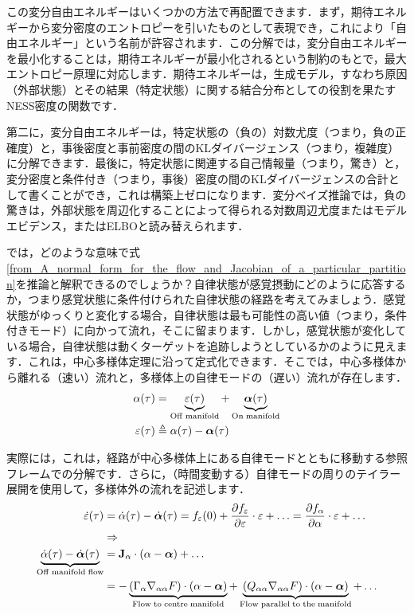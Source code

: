 \documentclass[a4paper, titlepage]{jsarticle}
\begin{document}
この変分自由エネルギーはいくつかの方法で再配置できます．まず，期待エネルギーから変分密度のエントロピーを引いたものとして表現でき，これにより「自由エネルギー」という名前が許容されます．この分解では，変分自由エネルギーを最小化することは，期待エネルギーが最小化されるという制約のもとで，最大エントロピー原理に対応します．期待エネルギーは，生成モデル，すなわち原因（外部状態）とその結果（特定状態）に関する結合分布としての役割を果たすNESS密度の関数です．
\par
第二に，変分自由エネルギーは，特定状態の（負の）対数尤度（つまり，負の正確度）と，事後密度と事前密度の間のKLダイバージェンス（つまり，複雑度）に分解できます．最後に，特定状態に関連する自己情報量（つまり，驚き）と，変分密度と条件付き（つまり，事後）密度の間のKLダイバージェンスの合計として書くことができ，これは構築上ゼロになります．変分ベイズ推論では，負の驚きは，外部状態を周辺化することによって得られる対数周辺尤度またはモデルエビデンス，またはELBOと読み替えられます．
\par
では，どのような意味で式\eqref{from_A_normal_form_for_the_flow_and_Jacobian_of_a_particular_partition}を推論と解釈できるのでしょうか？自律状態が感覚摂動にどのように応答するか，つまり感覚状態に条件付けられた自律状態の経路を考えてみましょう．感覚状態がゆっくりと変化する場合，自律状態は最も可能性の高い値（つまり，条件付きモード）に向かって流れ，そこに留まります．しかし，感覚状態が変化している場合，自律状態は動くターゲットを追跡しようとしているかのように見えます．これは，中心多様体定理に沿って定式化できます．そこでは，中心多様体から離れる（速い）流れと，多様体上の自律モードの（遅い）流れが存在します．
\begin{equation}
    \begin{aligned}
        \alpha\qty(\tau)&=\underbrace{\varepsilon\qty(\tau)}_{\mathrm{Off\;manifold}}+\underbrace{\bm{\alpha}\qty(\tau)}_{\mathrm{On\;manifold}} \\
        \varepsilon\qty(\tau)&\triangleq\alpha\qty(\tau)-\bm{\alpha}\qty(\tau)
    \end{aligned}
\end{equation}
\par
実際には，これは，経路が中心多様体上にある自律モードとともに移動する参照フレームでの分解です．さらに，（時間変動する）自律モードの周りのテイラー展開を使用して，多様体外の流れを記述します．
\begin{equation}
    \begin{aligned}
        \dot{\varepsilon}(\tau) &= \dot{\alpha}(\tau) - \dot{\bm{\alpha}}(\tau) = f_\varepsilon\qty(0)+\frac{\partial f_\varepsilon}{\partial \varepsilon}\cdot\varepsilon+\ldots=\frac{\partial f_\alpha}{\partial \alpha} \cdot \varepsilon + \dots \\
        &\Rightarrow \\
        \underbrace{\dot{\alpha}(\tau)-\dot{\bm{\alpha}}(\tau)}_{\mathrm{Off\;manifold\;flow}}&=\mathbf{J}_\alpha \cdot (\alpha - \bm{\alpha}) + \dots \\
        &=-\underbrace{\qty(\Gamma_{\alpha}\nabla_{\alpha\alpha}F)\cdot\qty(\alpha-\bm{\alpha})}_{\mathrm{Flow\;to\;centre\;manifold}}+\underbrace{\qty(Q_{\alpha\alpha}\nabla_{\alpha\alpha}F)\cdot\qty(\alpha-\bm{\alpha})}_{\mathrm{Flow\;parallel\;to\;the\;manifold}}+\dots
    \end{aligned}
\end{equation}
\end{document}
